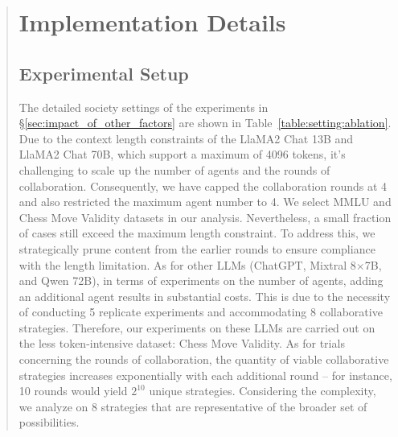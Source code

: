 \documentclass[11pt]{article}
\begin{document}
\begin{abstract}











\section{Implementation Details}
\label{app:exp_detail}

\subsection{Experimental Setup}
\label{app:setup}



% 
The detailed society settings of the experiments in \S\ref{sec:impact_of_other_factors} are shown in Table~\ref{table:setting:ablation}. 
Due to the context length constraints of the LlaMA2 Chat 13B and LlaMA2 Chat 70B, which support a maximum of 4096 tokens, it's challenging to scale up the number of agents and the rounds of collaboration. 
Consequently, we have capped the collaboration rounds at 4 and also restricted the maximum agent number to 4. 
We select MMLU and Chess Move Validity datasets in our analysis. 
Nevertheless, a small fraction of cases still exceed the maximum length constraint. 
To address this, we strategically prune content from the earlier rounds to ensure compliance with the length limitation.
As for other LLMs (ChatGPT, Mixtral 8$\times$7B, and Qwen 72B), in terms of experiments on the number of agents, adding an additional agent results in substantial costs. 
This is due to the necessity of conducting 5 replicate experiments and accommodating 8 collaborative strategies. 
Therefore, our experiments on these LLMs are carried out on the less token-intensive dataset: Chess Move Validity.
As for trials concerning the rounds of collaboration, the quantity of viable collaborative strategies increases exponentially with each additional round – for instance, 10 rounds would yield $2^{10}$ unique strategies. 
Considering the complexity, we analyze on 8 strategies that are representative of the broader set of possibilities. 


\end{abstract}
\end{document}
